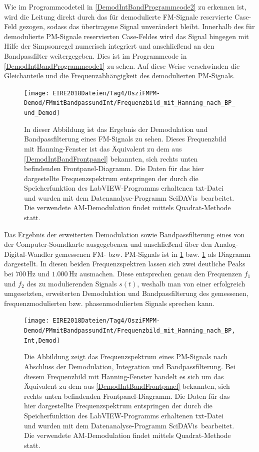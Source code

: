 \documentclass[
a4paper,
12pt,
pagesize,
ngerman
]{scrartcl}
\begin{document}
	\noindent Wie im Programmcodeteil in \cref{DemodIntBandProgrammcode2} zu erkennen ist, wird die Leitung direkt durch das für demodulierte FM-Signale reservierte Case-Feld gezogen, sodass das übertragene Signal unverändert bleibt.
	Innerhalb des für demodulierte PM-Signale reservierten Case-Feldes wird das Signal hingegen mit Hilfe der Simpsonregel numerisch integriert und anschließend an den Bandpassfilter weitergegeben.
	Dies ist im Programmcode in \cref{DemodIntBandProgrammcode1} zu sehen.
	Auf diese Weise verschwinden die Gleichanteile und die Frequenzabhängigkeit des demodulierten PM-Signals.
	
	\begin{figure}[H] %
		\centering
		\texttt{[image: EIRE2018Dateien/Tag4/OsziFMPM-Demod/FMmitBandpassundInt/Frequenzbild\_mit\_Hanning\_nach\_BP\_und\_Demod]}
		\caption{In dieser Abbildung ist das Ergebnis der Demodulation und Bandpassfilterung eines FM-Signals zu sehen. Dieses Frequenzbild mit Hanning-Fenster ist das Äquivalent zu dem aus \cref{DemodIntBandFrontpanel} bekannten, sich rechts unten befindenden Frontpanel-Diagramm. Die Daten für das hier dargestellte Frequenzspektrum entspringen der durch die Speicherfunktion des LabVIEW-Programms erhaltenen txt-Datei und wurden mit dem Datenanalyse-Programm \glqq SciDAVis\grqq\ bearbeitet. Die verwendete AM-Demodulation findet mittels \glqq Quadrat\grqq -Methode statt.}
		\label{FMIntBandDiagramm}
	\end{figure}
	
	\noindent Das Ergebnis der erweiterten Demodulation sowie Bandpassfilterung eines von der Computer-Soundkarte ausgegebenen und anschließend über den Analog-Digital-Wandler gemessenen FM- bzw. PM-Signals ist in \cref{FMIntBandDiagramm} bzw. \cref{FMIntBandDiagramm} als Diagramm dargestellt.
	In diesen beiden Frequenzspektren lassen sich zwei deutliche Peaks bei $700\,$Hz und $1.000\,$Hz ausmachen.
	Diese entsprechen genau den Frequenzen $f_1$ und $f_2$ des zu modulierenden Signals $s(t)$, weshalb man von einer erfolgreich umgesetzten, erweiterten Demodulation und Bandpassfilterung des gemessenen, frequenzmodulierten bzw. phasenmodulierten Signals sprechen kann.
	
	\begin{figure}[H] %
		\centering
		\texttt{[image: EIRE2018Dateien/Tag4/OsziFMPM-Demod/PMmitBandpassundInt/Frequenzbild\_mit\_Hanning\_nach\_BP,Int,Demod]}
		\caption{Die Abbildung zeigt das Frequenzspektrum eines PM-Signals nach Abschluss der Demodulation, Integration und Bandpassfilterung. Bei diesem Frequenzbild mit Hanning-Fenster handelt es sich um das Äquivalent zu dem aus \cref{DemodIntBandFrontpanel} bekannten, sich rechts unten befindenden Frontpanel-Diagramm. Die Daten für das hier dargestellte Frequenzspektrum entspringen der durch die Speicherfunktion des LabVIEW-Programms erhaltenen txt-Datei und wurden mit dem Datenanalyse-Programm \glqq SciDAVis\grqq\ bearbeitet. Die verwendete AM-Demodulation findet mittels \glqq Quadrat\grqq -Methode statt.}
		\label{PMIntBandDiagramm}
	\end{figure}
	
\end{document}
